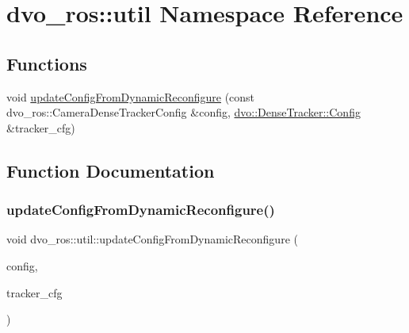 \hypertarget{namespacedvo__ros_1_1util}{}\section{dvo\+\_\+ros\+:\+:util Namespace Reference}
\label{namespacedvo__ros_1_1util}
\subsection*{Functions}
\begin{DoxyCompactItemize}
\item 
void \mbox{\hyperlink{namespacedvo__ros_1_1util_a23fc0ae872b034a6eb0c292e5bc417e1}{update\+Config\+From\+Dynamic\+Reconfigure}} (const dvo\+\_\+ros\+::\+Camera\+Dense\+Tracker\+Config \&config, \mbox{\hyperlink{structdvo_1_1_dense_tracker_1_1_config}{dvo\+::\+Dense\+Tracker\+::\+Config}} \&tracker\+\_\+cfg)
\end{DoxyCompactItemize}


\subsection{Function Documentation}
\mbox{\label{namespacedvo__ros_1_1util_a23fc0ae872b034a6eb0c292e5bc417e1}} 
\subsubsection{\texorpdfstring{update\+Config\+From\+Dynamic\+Reconfigure()}{updateConfigFromDynamicReconfigure()}}
{\footnotesize\ttfamily void dvo\+\_\+ros\+::util\+::update\+Config\+From\+Dynamic\+Reconfigure (\begin{DoxyParamCaption}\item[{const dvo\+\_\+ros\+::\+Camera\+Dense\+Tracker\+Config \&}]{config,  }\item[{\mbox{\hyperlink{structdvo_1_1_dense_tracker_1_1_config}{dvo\+::\+Dense\+Tracker\+::\+Config}} \&}]{tracker\+\_\+cfg }\end{DoxyParamCaption})}

